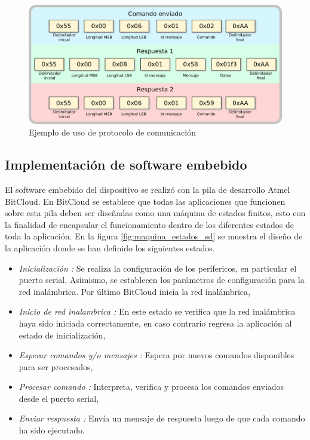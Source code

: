  
\begin{figure}
	\centering
	\includegraphics[scale=0.4]{capitulo_3_imgs/protocolo_ejemplo_1.pdf}
	\caption{Ejemplo de uso de protocolo de comunicación}
	\label{fig:protocolo_ejemplo}
\end{figure}

\subsection{Implementación de software embebido}

El software embebido del dispositivo se realizó con la pila de desarrollo Atmel BitCloud. En BitCloud se establece que todas las aplicaciones que funcionen sobre esta pila deben ser diseñadas como una máquina de estados finitos, esto con la finalidad de encapsular el funcionamiento dentro de los diferentes estados de toda la aplicación. En la figura \ref{fig:maquina_estados_sd} se muestra el diseño de la aplicación donde se han definido los siguientes estados. 

\begin{itemize}
	\item \textit{Inicialización : } Se realiza la configuración de los perífericos, en particular el puerto serial. Asimismo, se establecen los parámetros de configuración para la red inalámbrica. Por último BitCloud inicia la red inalámbrica, 
	\item \textit{Inicio de red inalambrica : } En este estado se verifica que la red inalámbrica haya sido iniciada correctamente, en caso contrario regresa la aplicación al estado de inicialización,  
	\item \textit{Esperar comandos y/o mensajes : } Espera por nuevos comandos disponibles para ser procesados,
	\item \textit{Procesar comando : } Interpreta, verifica y procesa los comandos enviados desde el puerto serial, 
	\item \textit{Enviar respuesta : } Envía un mensaje de respuesta luego de que cada comando ha sido ejecutado. 
\end{itemize}

